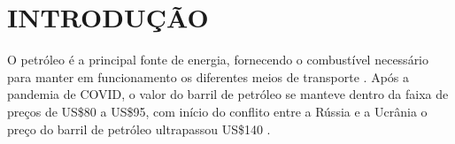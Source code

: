 \chapter[INTRODUÇÃO]{INTRODUÇÃO} \label{cap:introducao}

O petróleo é a principal fonte de energia, fornecendo o combustível necessário para manter em funcionamento os diferentes meios de transporte \cite{gauto2016petroleo}. 
Após a pandemia de COVID, o valor do barril de petróleo se  manteve dentro da faixa de preços de US\$80 a US\$95, com início do conflito entre a Rússia e a Ucrânia o preço do barril de petróleo ultrapassou US\$140 \cite{ozili2022global}. 

